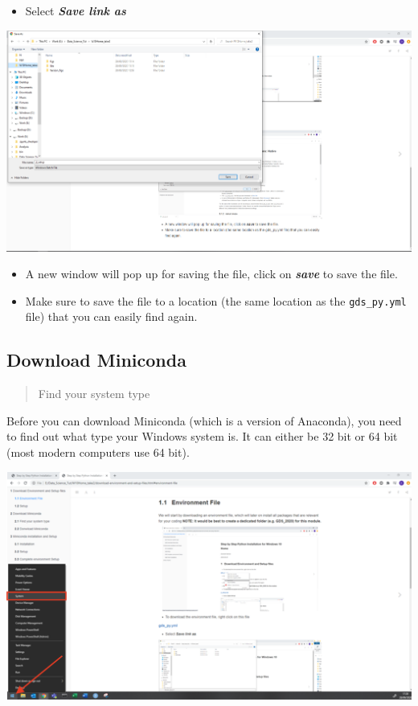 \documentclass[
]{book}
\providecommand{\tightlist}{%
  \setlength{\itemsep}{0pt}\setlength{\parskip}{0pt}}
\begin{document}
\begin{itemize}
\tightlist
\item
  Select \textbf{\emph{Save link as}}
\end{itemize}

\begin{center}\includegraphics[width=26.56in]{figs/chp4/Picture6_1} \end{center}

\begin{itemize}
\tightlist
\item
  A new window will pop up for saving the file, click on \textbf{\emph{save}} to save the file.
\item
  Make sure to save the file to a location (the same location as the \texttt{gds\_py.yml} file) that you can easily find again.
\end{itemize}

\hypertarget{download-miniconda}{%
\subsection*{Download Miniconda}\label{download-miniconda}}

\begin{quote}
Find your system type
\end{quote}

Before you can download Miniconda (which is a version of Anaconda), you need to find out what type your Windows system is.
It can either be 32 bit or 64 bit (most modern computers use 64 bit).

\begin{center}\includegraphics[width=37.67in]{figs/chp4/Picture7} \end{center}
\end{document}
